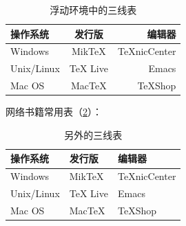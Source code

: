 \documentclass[12pt,a4paper]{article}
\begin{document}
\begin{table}[htbp]

\caption{浮动环境中的三线表}

\label{tab:a}

\centering

\begin{tabular}{l|c|r} %

\hline %

操作系统  &  发行版  &  编辑器  \\

\hline

Windows  &  MikTeX  &  TeXnicCenter  \\

Unix/Linux  &  TeX  Live  &  Emacs  \\

Mac  OS  &  MacTeX  &  TeXShop  \\

\hline

\end{tabular}

\end{table}



网络书籍常用表（\ref{tab:b}）：

\begin{table}[htbp]

\caption{另外的三线表}

\label{tab:b}

\centering

\begin{tabular}{lll}

\toprule

操作系统  &  发行版  &  编辑器  \\

\midrule

Windows  &  MikTeX  &  TeXnicCenter  \\

Unix/Linux  &  TeX  Live  &  Emacs  \\

Mac  OS  &  MacTeX  &  TeXShop  \\

\bottomrule

\end{tabular}

\end{table}



\end{document}
